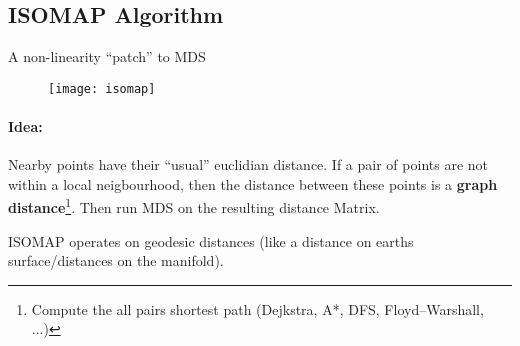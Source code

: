 
\subsection*{ISOMAP Algorithm}
A non-linearity ``patch'' to MDS

\begin{figure}[H]
	\centering
	\texttt{[image: isomap]}
\end{figure}

\paragraph{Idea:} Nearby points have their ``usual'' euclidian distance. If a pair of points are not within a local neigbourhood, then the distance between these points is a \textbf{graph distance}\footnote{Compute the all pairs shortest path (Dejkstra, A*,  DFS, Floyd–Warshall, ...)}. Then run MDS on the resulting distance Matrix.

ISOMAP operates on geodesic distances (like a distance on earths surface/distances on the manifold).

